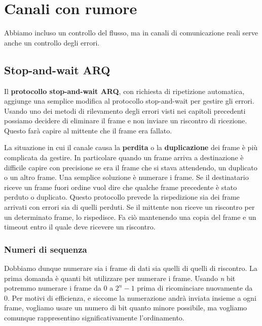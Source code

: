 \section{Canali con rumore}
    Abbiamo incluso un controllo del flusso, ma in canali di comunicazione reali serve anche un controllo degli errori.
    
    \subsection{Stop-and-wait ARQ}
        Il \textbf{protocollo stop-and-wait ARQ}, con richiesta di ripetizione automatica, aggiunge una semplice modifica al protocollo stop-and-wait per gestire gli errori. Usando uno dei metodi di rilevamento degli errori visti nei capitoli precedenti possiamo decidere di eliminare il frame e non inviare un riscontro di ricezione. Questo farà capire al mittente che il frame era fallato.
        
        La situazione in cui il canale causa la \textbf{perdita} o la \textbf{duplicazione} dei frame è più complicata da gestire. In particolare quando un frame arriva a destinazione è difficile capire con precisione se era il frame che si stava attendendo, un duplicato o un altro frame. Una semplice soluzione è numerare i frame. Se il destinatario riceve un frame fuori ordine vuol dire che qualche frame precedente è stato perduto o duplicato. Questo protocollo prevede la rispedizione sia dei frame arrivati con errori sia di quelli perduti. Se il mittente non riceve un riscontro per un determinato frame, lo rispedisce. Fa ciò mantenendo una copia del frame e un timeout entro il quale deve ricevere un riscontro.
        
        \subsubsection{Numeri di sequenza}
            Dobbiamo dunque numerare sia i frame di dati sia quelli di quelli di riscontro. La prima domanda è quanti bit utilizzare per numerare i frame. Usando \textit{n} bit potremmo numerare i frame da 0 a $2^n - 1$ prima di ricominciare nuovamente da 0. Per motivi di efficienza, e siccome la numerazione andrà inviata insieme a ogni frame, vogliamo usare un numero di bit quanto minore possibile, ma vogliamo comunque rappresentino significativamente l'ordinamento.
            
